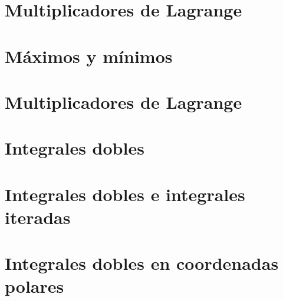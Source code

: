 \documentclass[openany]{book}
\begin{document}
\chapter{Multiplicadores de Lagrange} %


\chapter{Máximos y mínimos} %

\chapter{Multiplicadores de Lagrange}

\chapter{Integrales dobles} %


\chapter{Integrales dobles e integrales iteradas} %


\chapter{Integrales dobles en coordenadas polares}

\end{document}

